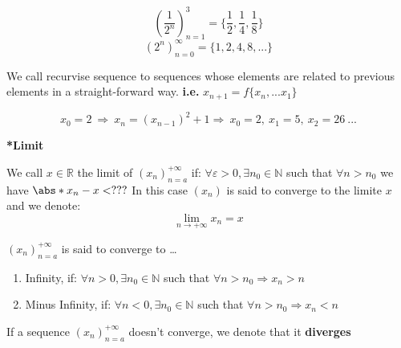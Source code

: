 \documentclass[12pt, a4paper]{book}
\begin{document}
\begin{exmp}
  $$(\frac{1}{2^n})^3_{n=1} = \{\frac{1}{2}, \frac{1}{4}, \frac{1}{8}\}$$
  $$(2^n)^\infty_{n=0} = \{1,2,4,8, ...\}$$
\end{exmp}

\begin{defn} We call recurvise sequence to sequences whose elements are related to 
  previous elements in a straight-forward way. \textbf{i.e.} $x_{n+1}=f\{x_n,...x_1\}$
\end{defn}

\begin{exmp}
  $$x_0=2 \ \Rightarrow \ x_n=(x_{n-1})^2+1 \Rightarrow \ x_0=2,\  x_1=5,\  x_2=26 \ ...$$ \newline
\end{exmp}

\textbf{*Limit}

\begin{defn} We call $x \in \mathbb{R}$ the limit of $(x_n)^{+\infty}_{n=a}$ if: \newline
  \text{\hspace{1cm}} $\forall \varepsilon >0, \exists n_0 \in \mathbb{N}$ such that $\forall n >n_0$ we have $\abs*{x_n-x}< ???$ \newline
  In this case $(x_n)$ is said to converge to the limite $x$ and we denote:
  $$\lim_{n\rightarrow +\infty}x_n=x$$
  
\end{defn}

\begin{defn} $(x_n)^{+\infty}_{n=a}$ is said to converge to \dots
  \begin{enumerate}[label=\alph*]
    \item Infinity, if: $\forall n >0, \exists n_0 \in \mathbb{N}$ such that $\forall n >n_0 \Rightarrow x_n>n$
    \item Minus Infinity, if: $\forall n<0, \exists n_0 \in \mathbb{N}$ such that $\forall n >n_0 \Rightarrow x_n < n$ \newline
  \end{enumerate}
\end{defn}

\begin{defn} If a sequence $(x_n)^{+\infty}_{n=a}$ doesn't converge, we denote that it \textbf{diverges}
\end{defn}
\end{document}
